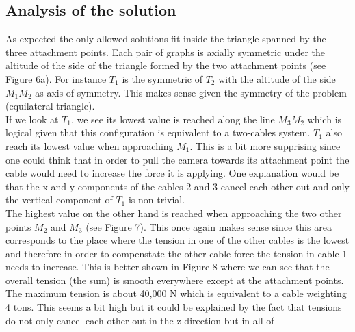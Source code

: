\documentclass[10 pt]{article}
\begin{document}
\begin{multicols}{2}
\subsection{Analysis of the solution}

As expected the only allowed solutions fit inside the triangle spanned by the three attachment points. Each pair of graphs is axially symmetric under the altitude of the side of the triangle formed by the two attachment points (see Figure 6a). For instance $T_1$ is the symmetric of $T_2$ with the altitude of the side $M_1 M_2$ as axis of symmetry. This makes sense given the symmetry of the problem (equilateral triangle).\\
If we look at $T_1$, we see its lowest value is reached along the line $M_3 M_2$ which is logical given that this configuration is equivalent to a two-cables system. $T_1$ also reach its lowest value when approaching $ M_1$. This is a bit more supprising since one could think that in order to pull the camera towards its attachment point the cable would need to increase the force it is applying. One explanation would be that the x and y components of the cables 2 and 3 cancel each other out and only the vertical component of $T_1$ is non-trivial.\\
The highest value on the other hand is reached when approaching the two other points $M_2$ and $M_3$ (see Figure 7). This once again makes sense since this area corresponds to the place where the tension in one of the other cables is the lowest and therefore in order to compenstate the other cable force the tension in cable 1 needs to increase. This is better shown in Figure 8 where we can see that the overall tension (the sum) is smooth everywhere except at the attachment points.\\
The maximum tension is about 40,000 N which is equivalent to a cable weighting 4 tons. This seems a bit high but it could be explained by the fact that tensions do not only cancel each other out in the z direction but in all of 
 


\end{multicols}
\end{document}
